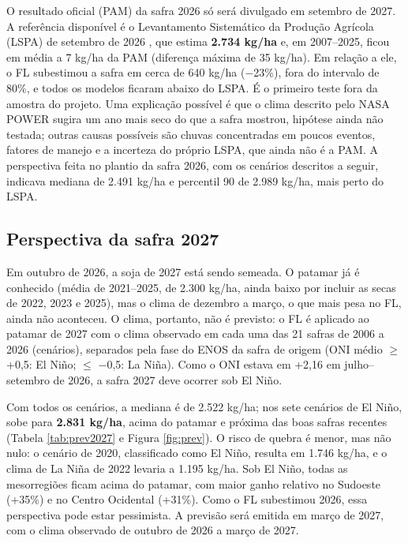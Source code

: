 \documentclass[
	article,			%
	11pt,				%
	oneside,			%
	a4paper,			%
	english,			%
	brazil,				%
	sumario=tradicional
	]{abntex2}
\begin{document}
O resultado oficial (PAM) da safra 2026 só será divulgado em setembro de 2027. A referência disponível é o Levantamento Sistemático da Produção Agrícola (LSPA) de setembro de 2026 \cite{ibgelspa}, que estima \textbf{2.734 kg/ha} e, em 2007--2025, ficou em média a 7 kg/ha da PAM (diferença máxima de 35 kg/ha). Em relação a ele, o FL subestimou a safra em cerca de 640 kg/ha ($-$23\%), fora do intervalo de 80\%, e todos os modelos ficaram abaixo do LSPA. É o primeiro teste fora da amostra do projeto. Uma explicação possível é que o clima descrito pelo NASA POWER sugira um ano mais seco do que a safra mostrou, hipótese ainda não testada; outras causas possíveis são chuvas concentradas em poucos eventos, fatores de manejo e a incerteza do próprio LSPA, que ainda não é a PAM. A perspectiva feita no plantio da safra 2026, com os cenários descritos a seguir, indicava mediana de 2.491 kg/ha e percentil 90 de 2.989 kg/ha, mais perto do LSPA.

\subsection{Perspectiva da safra 2027}\label{sec:perspectiva}

Em outubro de 2026, a soja de 2027 está sendo semeada. O patamar já é conhecido (média de 2021--2025, de 2.300 kg/ha, ainda baixo por incluir as secas de 2022, 2023 e 2025), mas o clima de dezembro a março, o que mais pesa no FL, ainda não aconteceu. O clima, portanto, não é previsto: o FL é aplicado ao patamar de 2027 com o clima observado em cada uma das 21 safras de 2006 a 2026 (cenários), separados pela fase do ENOS da safra de origem (ONI médio $\geq$ +0,5: El Niño; $\leq$ $-$0,5: La Niña). Como o ONI estava em +2,16 em julho--setembro de 2026, a safra 2027 deve ocorrer sob El Niño.

Com todos os cenários, a mediana é de 2.522 kg/ha; nos sete cenários de El Niño, sobe para \textbf{2.831 kg/ha}, acima do patamar e próxima das boas safras recentes (Tabela \ref{tab:prev2027} e Figura \ref{fig:prev}). O risco de quebra é menor, mas não nulo: o cenário de 2020, classificado como El Niño, resulta em 1.746 kg/ha, e o clima de La Niña de 2022 levaria a 1.195 kg/ha. Sob El Niño, todas as mesorregiões ficam acima do patamar, com maior ganho relativo no Sudoeste (+35\%) e no Centro Ocidental (+31\%). Como o FL subestimou 2026, essa perspectiva pode estar pessimista. A previsão será emitida em março de 2027, com o clima observado de outubro de 2026 a março de 2027.
\end{document}
